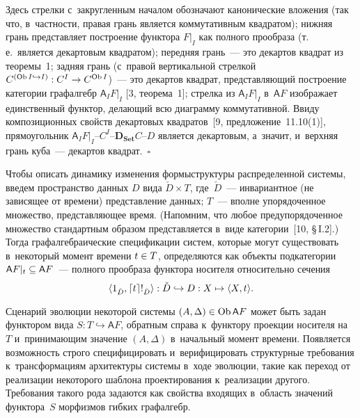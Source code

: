 \begin{multicols}{2}
\noindent
     Здесь стрелки с~закругленным началом обозначают канонические 
вложения (так что, в~част\-ности, правая грань является коммутативным 
квад\-ра\-том); ниж\-няя грань представляет построение функтора $F\vert_I$ как 
полного прообраза (т.\,е.\ является декартовым квад\-ра\-том); передняя грань~--- 
это декартов квад\-рат из тео\-ре\-мы~1; задняя грань (с~правой вертикальной 
стрелкой $C^{(\mathrm{Ob}\,I \hookrightarrow I)} : C^I \hm\to  C^{\mathrm{Ob}\,I}$)~--- это 
декартов квадрат, представляющий построение категории графалгебр $\mathsf{A}_I F\vert_I$ [3, 
теорема~1]; стрелка из $\mathsf {A}_I F\vert_I$ в~$\mathsf {A}F$ изображает 
единственный функтор, де\-ла\-ющий всю диаграмму коммутативной. Ввиду 
композиционных свойств декартовых квад\-ра\-тов~[9, предложение~11.10(1)], 
прямоугольник $\mathsf {A}_I F\vert_I$--$C^I$--$\mathbf{D}_{\mathbf{Set}}C$--$D$ является 
декартовым, а~значит, и~верх\-няя грань куба~--- декартов квад\-рат.~\hfill$\square$
     
     Чтобы описать динамику изменения формы\linebreak структуры распределенной 
системы, введем пространство данных $D$ вида $\check{D}\times T$, 
где~$\check{D}$~--- инвариантное (не зависящее от времени) пред\-став\-ле\-ние 
данных; $T$~--- вполне упорядоченное \mbox{множество}, пред\-став\-ля\-ющее время. 
(Напомним, что любое предупорядоченное множество стандартным образом 
пред\-став\-ля\-ет\-ся в~виде категории~[10, \S\,I.2].) Тогда графалгебраические 
спецификации сис\-тем, которые могут существовать в~некоторый момент 
времени $t \hm\in T$, определяются как объекты подкатегории 
$\mathsf {A}F\vert_t \hm\subseteq \mathsf {A}F$~--- полного прообраза 
функтора носителя относительно сечения 
$$
\langle 1_{\check{D}}, \lceil t\rceil  !_{\check{D}}\rangle  : \check{D} \hm\hookrightarrow D : X \hm\mapsto \langle X, 
t\rangle.
$$

 Сценарий эволюции некоторой сис\-те\-мы $(A, \Delta) \hm\in 
\mathrm{Ob}\,\mathsf {A}F$ может быть задан функтором вида $S : T 
\hookrightarrow \mathsf {A}F$, обратным справа к~функтору проекции 
{носителя} на~$T$ и~при\-ни\-ма\-ющим значение $(A, \Delta)$ в~начальный момент 
времени. Появляется воз\-мож\-ность строго специфицировать и~верифицировать 
структурные требования к~трансформациям архитектуры сис\-те\-мы в~ходе 
эволюции, такие как переход от реализации некоторого шаб\-ло\-на 
проектирования к~реализации другого. Требования такого рода задаются как 
свойства входящих в~об\-ласть значений функтора~$S$ морфизмов гиб\-ких 
графалгебр.
     

\end{multicols}

